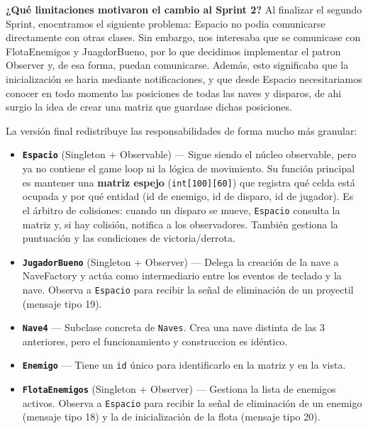 \documentclass[12pt, a4paper]{article}
\begin{document}
\vspace{0.8em}
\textbf{¿Qu\'{e} limitaciones motivaron el cambio al Sprint 2?} 
Al finalizar el segundo Sprint, enocntramos el siguiente problema: Espacio no podia comunicarse directamente con otras clases. Sin embargo, nos interesaba que se comunicase con FlotaEnemigos y JuagdorBueno, por lo que decidimos implementar el patron Observer y, de esa forma, puedan comunicarse. Además, esto significaba que la inicialización se haria mediante notificaciones, y que desde Espacio necesitariamos conocer en todo momento las posiciones de todas las naves y disparos, de ahi surgio la idea de crear una matriz que guardase dichas posiciones.
 
\vspace{0.5em}

\begin{cajafinal}
La versi\'{o}n final redistribuye las responsabilidades de forma mucho m\'{a}s granular:
 
\begin{itemize}
    \item \textbf{\texttt{Espacio}} (Singleton + Observable) --- Sigue siendo el n\'{u}cleo observable, pero ya no contiene el game loop ni la l\'{o}gica de movimiento. Su funci\'{o}n principal es mantener una \textbf{matriz espejo} (\texttt{int[100][60]}) que registra qu\'{e} celda est\'{a} ocupada y por qu\'{e} entidad (id de enemigo, id de disparo, id de jugador). Es el \'{a}rbitro de colisiones: cuando un disparo se mueve, \texttt{Espacio} consulta la matriz y, si hay colisi\'{o}n, notifica a los observadores. Tambi\'{e}n gestiona la puntuaci\'{o}n y las condiciones de victoria/derrota.
 
    \item \textbf{\texttt{JugadorBueno}} (Singleton + Observer) --- Delega la creaci\'{o}n de la nave a NaveFactory y act\'{u}a como intermediario entre los eventos de teclado y la nave. Observa a \texttt{Espacio} para recibir la se\~{n}al de eliminaci\'{o}n de un proyectil (mensaje tipo 19).
 
    \item \textbf{\texttt{Nave4}} --- Subclase concreta de \texttt{Naves}. Crea una nave distinta de las 3 anteriores, pero el funcionamiento y construccion es idéntico.
 
    \item \textbf{\texttt{Enemigo}} --- Tiene un \texttt{id} \'{u}nico para identificarlo en la matriz y en la vista.
 
    \item \textbf{\texttt{FlotaEnemigos}} (Singleton + Observer) --- Gestiona la lista de enemigos activos. Observa a \texttt{Espacio} para recibir la se\~{n}al de eliminaci\'{o}n de un enemigo (mensaje tipo 18) y la de inicializaci\'{o}n de la flota (mensaje tipo 20).
 

\end{itemize}
\end{cajafinal}
\end{document}
